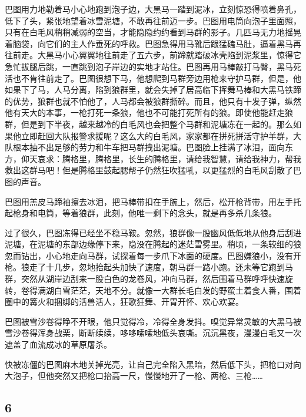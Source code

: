 \par 巴图用力地勒着马小心地跑到泡子边，大黑马一踏到泥冰，立刻惊恐得喷着鼻孔，低下了头，紧张地望着冰雪泥塘，不敢再往前迈一步。巴图用电筒向泡子里面照，只有在白毛风稍稍减弱的空当，才能隐隐约约看到马群的影子。几匹马无力地摇晃着脑袋，向它们的主人作垂死的呼救。巴图急得用马靴后跟猛磕马肚，逼着黑马再往前走。大黑马小心翼翼地往前走了五六步，前蹄就踏破冰壳陷到泥浆里，惊得它急忙拔腿后跳，一直跳到泡子岸边的实地才站住。巴图再用马棒敲打马臀，黑马死活也不肯往前走了。巴图很想下马，他想爬到马群旁边用枪来守护马群，但是，他如果下了马，人马分离，陷到狼群里，就会失掉了居高临下挥舞马棒和大黑马铁蹄的优势，狼群也就不怕他了，人马都会被狼群撕碎。而且，他只有十发子弹，纵然他有天大的本事，一枪打死一条狼，他也不可能打死所有的狼。即使他能赶走狼群，但是到下半夜，越来越冷的白毛风也会把整个马群和泥塘冻在一起的。那么如果他立即赶回大队报警求援呢？这么大的白毛风，家家都在拼死拼活守护羊群，大队根本抽不出足够的劳力和牛车把马群拽出泥塘。巴图脸上挂满了冰泪，面向东方，仰天哀求：腾格里，腾格里，长生的腾格里，请给我智慧，请给我神力，帮我救出这群马吧！但是腾格里鼓起腮帮子仍然狂吹猛吼，以更猛烈的白毛风刮散了巴图的声音。
\par 巴图用羔皮马蹄袖擦去冰泪，把马棒带扣在手腕上，然后，松开枪背带，用左手托起枪身和电筒，等着狼群，此刻，他唯一剩下的念头，就是再多杀几条狼。
\par 过了很久，巴图冻得已经坐不稳马鞍。忽然，狼群像一股幽风低低地从他身后刮进泥塘，在泥塘的东部边缘停下来，隐没在腾起的迷茫雪雾里。稍顷，一条较细的狼忽而钻出，小心地走向马群，试探着每一步爪下冰面的硬度。巴图嫌狼小，没有开枪。狼走了十几步，忽地抬起头加快了速度，朝马群一路小跑。还未等它跑到马群，突然从湖岸边刮来一股白色的龙卷风，冲向马群，然后围着马群呼呼快速旋转，卷得满湖白雪茫茫，天地不分。就像一大群长毛白发的野蛮土着食人番，围着圈中的篝火和捆绑的活兽活人，狂歌狂舞、开胃开怀、欢心欢宴。
\par 巴图被雪沙卷得睁不开眼，他只觉得冷，冷得全身发抖。嗅觉异常灵敏的大黑马被雪沙卷得浑身战栗，断断续续，哆哆嗦嗦地低头哀嘶。沉沉黑夜，漫漫白毛又一次遮盖了血流成冰的草原屠杀。
\par 快被冻僵的巴图麻木地关掉光亮，让自己完全陷入黑暗，然后低下头，把枪口对向大泡子，但他突然又把枪口抬高一尺，慢慢地开了一枪、两枪、三枪……
    


\subsection*{6}


